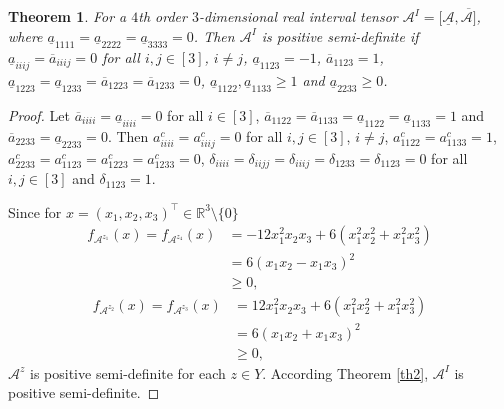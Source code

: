 \documentclass[twoside]{article}
\newtheorem{theorem}{Theorem}[section]
\newtheorem{corollary}{Corollary}[section]
\begin{document}
\begin{theorem}\label{th3.1}
For a $4$th order $3$-dimensional real interval tensor ${\mathcal{A}}^I=[\underline{\mathcal{A}},\overline{\mathcal{A}]}$, where  $\underline{a}_{1111}=\underline{a}_{2222}=\underline{a}_{3333}=0$. Then ${\mathcal{A}}^I$ is positive semi-definite if $\underline{a}_{iiij}=\overline{a}_{iiij}=0$ for all $i,j\in[3]$, $i\neq j$, $\underline{a}_{1123}=-1$, $\overline{a}_{1123}=1$, $\underline{a}_{1223}=\underline{a}_{1233}=\overline{a}_{1223}=\overline{a}_{1233}=0$, $\underline{a}_{1122},\underline{a}_{1133}\geq1$ and $\underline{a}_{2233}\geq0$.
\end{theorem}
\begin{proof}
Let $\overline{a}_{iiii}=\underline{a}_{iiii}=0$ for all $i\in[3]$, $\overline{a}_{1122}=\overline{a}_{1133}=\underline{a}_{1122}=\underline{a}_{1133}=1$ and $\overline{a}_{2233}=\underline{a}_{2233}=0$. Then $a^c_{iiii}=a^c_{iiij}=0$ for all $i,j\in[3]$, $i\neq j$, $a^c_{1122}=a^c_{1133}=1$, $a^c_{2233}=a^c_{1123}=a^c_{1223}=a^c_{1233}=0$, $\delta_{iiii}=\delta_{iijj}=\delta_{iiij}=\delta_{1233}=\delta_{1123}=0$ for all $i,j\in[3]$ and $\delta_{1123}=1$.

Since for $x=(x_1,x_2,x_3)^{\top}\in\mathbb{R}^3\setminus\{0\}$
\begin{align*}
  f_{\mathcal{A}^{z_1}}(x)=f_{\mathcal{A}^{z_4}}(x)&=-12x_1^2x_2x_3+6(x_1^2x_2^2+x_1^2x_3^2)\\
  &=6(x_1x_2-x_1x_3)^2\\
  &\geq0,
\end{align*}
\begin{align*}
  f_{\mathcal{A}^{z_2}}(x)=f_{\mathcal{A}^{z_3}}(x)&=12x_1^2x_2x_3+6(x_1^2x_2^2+x_1^2x_3^2)\\
  &=6(x_1x_2+x_1x_3)^2\\
  &\geq0,
\end{align*}
$\mathcal{A}^z$ is positive semi-definite for each $z\in Y$. According Theorem \ref{th2}, $\mathcal{A}^I$ is positive semi-definite.
\end{proof}


\end{document}
